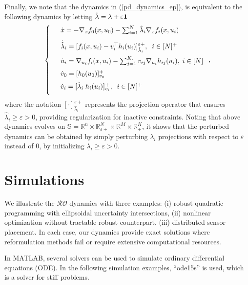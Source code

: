 \documentclass[journal,twoside,web]{ieeecolor}
\newcommand{\rev}[1]{#1}
\begin{document}
Finally, we note that the dynamics in (\ref{pd_dynamics_ep}), is equivalent to the following dynamics by letting $\hat{\lambda}=\lambda+\varepsilon {\bf 1}$
\begin{align} \label{pd_dynamics_0}
\left\{
\begin{array}{cl}
\vspace{3mm}
&\dot x=-\nabla_x f_0(x,u_0)-\sum_{i=1}^N\hat{\lambda}_i \nabla_x f_i(x,u_i)\\
\vspace{2mm}
&\dot{\hat{\lambda}}_i=[f_i(x,u_i)-v_i^\top h_i(u_i)]_{\hat{\lambda}_i}^{\varepsilon +},\;\; i\in[N]^+\\
\vspace{2mm}
&\dot u_i=\nabla_{u_i}f_i(x,u_i)-\sum_{j=1}^{K_i} v_{ij} \nabla_{u_i} h_{ij}(u_i),\; i\in[N]\\
\vspace{2mm}
&\dot{v}_0=[h_0(u_0)]_{v_0}^+\\
\vspace{2mm}
&\dot v_i=[\hat{\lambda}_i \; h_i(u_i)]_{v_i}^+,\;\;i\in[N]^+
\end{array}\right.,
\end{align}
\rev{where the notation $[\cdot]_{\hat{\lambda}_i}^{\varepsilon+}$ represents the projection operator that ensures $\hat{\lambda}_i \geq \varepsilon > 0$, providing regularization for inactive constraints.}
Noting that above dynamics evolves on $\mathbb{S}= \mathbb{R}^n \times \mathbb{R}^N_{\varepsilon +} \times \mathbb{R}^M \times \mathbb{R}^K_+$, it shows that the perturbed dynamics can be obtained by simply perturbing $\lambda_i$ projections with respect to $\varepsilon$ instead of $0$, by initializing $\lambda_i \geq \varepsilon > 0$.


\section{Simulations}\label{section_simulations}



We illustrate the $\mathcal{RO}$ dynamics with three examples: (i) robust quadratic programming with ellipsoidal uncertainty intersections, (ii) nonlinear optimization without tractable robust counterpart, (iii) distributed sensor placement. In each case, our dynamics provide exact solutions where reformulation methods fail or require extensive computational resources.

In MATLAB, several solvers can be used to simulate ordinary differential equations (ODE). In the following simulation examples, ``ode15s'' is used, which is a solver for stiff problems.
\end{document}
